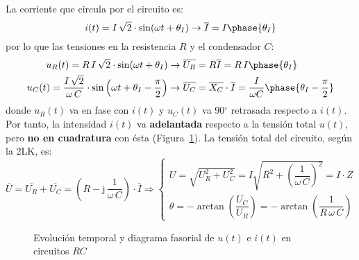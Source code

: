 \documentclass[11pt]{book} %
\numberwithin{dummy}{section}
\theoremstyle{ocrenumbox}
\theoremstyle{blacknumex}
\theoremstyle{blacknumbox}
\theoremstyle{ocrenum}
\newlength\esp
\begin{document}
	La corriente que circula por el circuito es:
	\begin{equation*}
		i(t)=I\,\sqrt{2}\cdot\sin(\omega t+\theta_I)\rightarrow\overline{I}=I\phase{\theta_I}
	\end{equation*}
	por lo que las tensiones en la resistencia $R$ y el condensador $C$:
	\begin{align*}
		u_R(t)=R\, I\,\sqrt{2}\cdot\sin(\omega t+\theta_I)&\rightarrow \overline{U_R} = R \overline{I}=R\,I\phase{\theta_I}\\ 
		u_C(t)=\dfrac{I\,\sqrt{2}}{\omega\,C} \cdot \sin \left(\omega t+\theta_I-\frac{\pi}{2}\right)&\rightarrow \overline{U_C}=\overline{X_C}\cdot\overline{I}=\dfrac{I}{\omega C}\phase{\theta_I-\frac{\pi}{2}}
	\end{align*}
	donde $u_R(t)$ va en fase con $i(t)$ y $u_C(t)$ va 90$^\circ$ retrasada respecto a $i(t)$. Por tanto, la intensidad $i(t)$ va \textbf{adelantada} respecto a la tensión total $u(t)$, pero \textbf{no en cuadratura} con ésta  (Figura~\ref{fig.fasorCapacitivoReal_VI}). La tensión total del circuito, según la 2LK, es:  
	\begin{equation*}
		\overline{U} = \overline{U_R} + \overline{U_C} =\left(R - \mathrm{j}\,\dfrac{1}{\omega\,C}\right) \cdot \overline{I}\Rightarrow 
		\begin{cases}
			U=\sqrt{U_R^2+U_C^2}=I\sqrt{R^2+\left(\dfrac{1}{\omega\,C}\right)^2}=I\cdot Z\\
			\theta=-\arctan\left( \dfrac{U_C}{U_R}\right)=-\arctan\left( \dfrac{1}{R\,\omega\,C}\right)
		\end{cases}
	\end{equation*}
	
	\begin{figure}[htbp]
		\centering
		\hfil
		\caption{Evolución temporal y diagrama fasorial de $u(t)$ e $i(t)$ en circuitos $RC$}
		\label{fig.fasorCapacitivoReal_VI}
	\end{figure}
	
\end{document}
